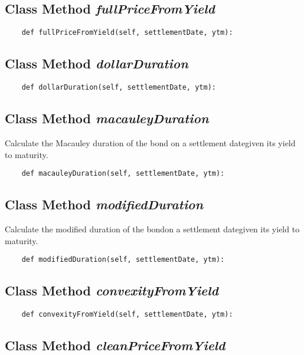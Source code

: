 \documentclass[twoside,11pt]{book}
\begin{document}
\subsection{Class Method {\it fullPriceFromYield}}


\begin{lstlisting}
    def fullPriceFromYield(self, settlementDate, ytm):
\end{lstlisting}

\subsection{Class Method {\it dollarDuration}}


\begin{lstlisting}
    def dollarDuration(self, settlementDate, ytm):
\end{lstlisting}

\subsection{Class Method {\it macauleyDuration}}
Calculate the Macauley duration of the bond on a settlement dategiven its yield to maturity. 

\begin{lstlisting}
    def macauleyDuration(self, settlementDate, ytm):
\end{lstlisting}

\subsection{Class Method {\it modifiedDuration}}
Calculate the modified duration of the bondon a settlement dategiven its yield to maturity. 

\begin{lstlisting}
    def modifiedDuration(self, settlementDate, ytm):
\end{lstlisting}

\subsection{Class Method {\it convexityFromYield}}


\begin{lstlisting}
    def convexityFromYield(self, settlementDate, ytm):
\end{lstlisting}

\subsection{Class Method {\it cleanPriceFromYield}}
\end{document}
